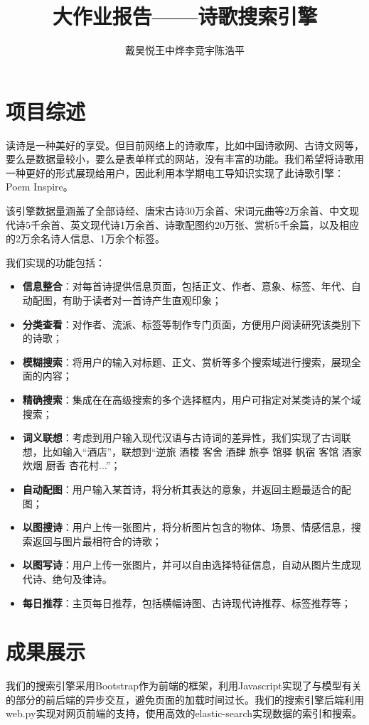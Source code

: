 \documentclass[a4paper, 10pt]{article}
\title{大作业报告——诗歌搜索引擎}
\author{戴昊悦\quad 王中烨\quad 李竞宇\quad 陈浩平}
\begin{document}
\maketitle
\tableofcontents
\section{项目综述}
读诗是一种美好的享受。但目前网络上的诗歌库，比如中国诗歌网、古诗文网等，要么是数据量较小，要么是表单样式的网站，没有丰富的功能。我们希望将诗歌用一种更好的形式展现给用户，因此利用本学期电工导知识实现了此诗歌引擎：Poem Inspire。

该引擎数据量涵盖了全部诗经、唐宋古诗30万余首、宋词元曲等2万余首、中文现代诗5千余首、英文现代诗1万余首、诗歌配图约20万张、赏析5千余篇，以及相应的2万余名诗人信息、1万余个标签。

我们实现的功能包括：
\begin{itemize}
\setlength{\itemsep}{0pt}
\setlength{\parsep}{0pt}
\setlength{\parskip}{0pt}
    \item \textbf{信息整合}：对每首诗提供信息页面，包括正文、作者、意象、标签、年代、自动配图，有助于读者对一首诗产生直观印象；
    \item \textbf{分类查看}：对作者、流派、标签等制作专门页面，方便用户阅读研究该类别下的诗歌；
    \item \textbf{模糊搜索}：将用户的输入对标题、正文、赏析等多个搜索域进行搜索，展现全面的内容；
    \item \textbf{精确搜索}：集成在在高级搜索的多个选择框内，用户可指定对某类诗的某个域搜索；
    \item \textbf{词义联想}：考虑到用户输入现代汉语与古诗词的差异性，我们实现了古词联想，比如输入“酒店”，联想到“逆旅 酒楼 客舍 酒肆 旅亭 馆驿 帆宿 客馆 酒家 炊烟 厨香 杏花村...”；
    \item \textbf{自动配图}：用户输入某首诗，将分析其表达的意象，并返回主题最适合的配图；
    \item \textbf{以图搜诗}：用户上传一张图片，将分析图片包含的物体、场景、情感信息，搜索返回与图片最相符合的诗歌；
    \item \textbf{以图写诗}：用户上传一张图片，并可以自由选择特征信息，自动从图片生成现代诗、绝句及律诗。
    \item \textbf{每日推荐}：主页每日推荐，包括横幅诗图、古诗现代诗推荐、标签推荐等；
\end{itemize}

\newpage
\section{成果展示}
我们的搜索引擎采用Bootstrap作为前端的框架，利用Javascript实现了与模型有关的部分的前后端的异步交互，避免页面的加载时间过长。我们的搜索引擎后端利用web.py实现对网页前端的支持，使用高效的elastic-search实现数据的索引和搜索。
\end{document}
